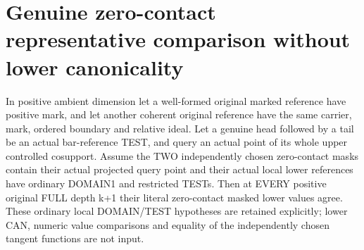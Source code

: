\section{Genuine zero-contact representative comparison without lower canonicality}

\begin{theorem}
\label{hir:original-zero-contact-representative-values}
\leanok
In positive ambient dimension let a well-formed original marked reference
have positive mark, and let another coherent original reference have the
same carrier, mark, ordered boundary and relative ideal. Let a genuine
head followed by a tail be an actual bar-reference TEST, and query an
actual point of its whole upper controlled cosupport. Assume the TWO
independently chosen zero-contact masks contain their actual projected
query point and their actual local lower references have ordinary DOMAIN1
and restricted TESTs. Then at EVERY positive original FULL depth k+1
their literal zero-contact masked lower values agree. These ordinary local
DOMAIN/TEST hypotheses are retained explicitly; lower CAN, numeric value
comparisons and equality of the independently chosen tangent functions
are not input.
\end{theorem}
